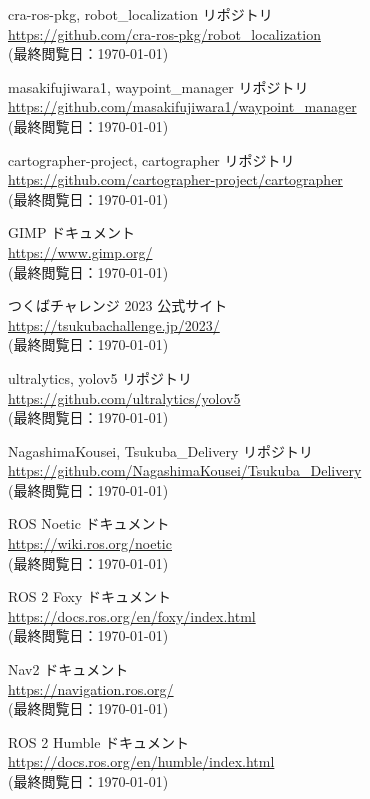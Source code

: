 \documentclass[twocolumn, 9pt]{jsproceedings}
\begin{document}
\begin{thebibliography}{99}
cra-ros-pkg, robot\_localization リポジトリ\\
\url{https://github.com/cra-ros-pkg/robot_localization}\\
(最終閲覧日：\today)

masakifujiwara1, waypoint\_manager リポジトリ\\
\url{https://github.com/masakifujiwara1/waypoint_manager}\\
(最終閲覧日：\today)

cartographer-project, cartographer リポジトリ\\
\url{https://github.com/cartographer-project/cartographer}\\
(最終閲覧日：\today)

GIMP ドキュメント\\
\url{https://www.gimp.org/}\\
(最終閲覧日：\today)

つくばチャレンジ 2023 公式サイト\\
\url{https://tsukubachallenge.jp/2023/}\\
(最終閲覧日：\today)

ultralytics, yolov5 リポジトリ\\
\url{https://github.com/ultralytics/yolov5}\\
(最終閲覧日：\today)

NagashimaKousei, Tsukuba\_Delivery リポジトリ\\
\url{https://github.com/NagashimaKousei/Tsukuba_Delivery}\\
(最終閲覧日：\today)

ROS Noetic ドキュメント\\
\url{https://wiki.ros.org/noetic}\\
(最終閲覧日：\today)

ROS 2 Foxy ドキュメント\\
\url{https://docs.ros.org/en/foxy/index.html}\\
(最終閲覧日：\today)

Nav2 ドキュメント\\
\url{https://navigation.ros.org/}\\
(最終閲覧日：\today)

ROS 2 Humble ドキュメント\\
\url{https://docs.ros.org/en/humble/index.html}\\
(最終閲覧日：\today)



\end{thebibliography}
\normalsize
\end{document}
